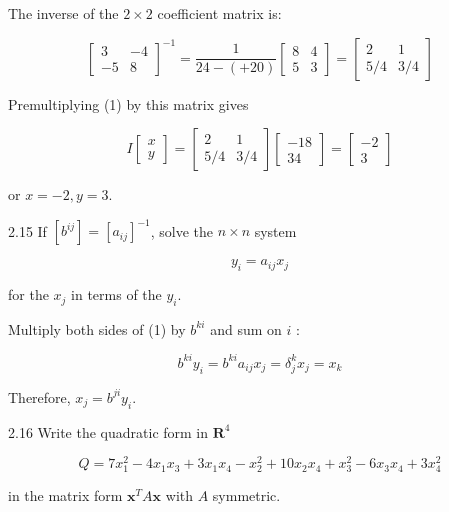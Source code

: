 \documentclass[10pt]{article}
\begin{document}
The inverse of the $2 \times 2$ coefficient matrix is:

$$
\left[\begin{array}{rr}
3 & -4 \\
-5 & 8
\end{array}\right]^{-1}=\frac{1}{24-(+20)}\left[\begin{array}{ll}
8 & 4 \\
5 & 3
\end{array}\right]=\left[\begin{array}{cc}
2 & 1 \\
5 / 4 & 3 / 4
\end{array}\right]
$$

Premultiplying (1) by this matrix gives

$$
I\left[\begin{array}{l}
x \\
y
\end{array}\right]=\left[\begin{array}{cc}
2 & 1 \\
5 / 4 & 3 / 4
\end{array}\right]\left[\begin{array}{r}
-18 \\
34
\end{array}\right]=\left[\begin{array}{r}
-2 \\
3
\end{array}\right]
$$

or $x=-2, y=3$.

2.15 If $\left[b^{i j}\right]=\left[a_{i j}\right]^{-1}$, solve the $n \times n$ system


\begin{equation*}
y_{i}=a_{i j} x_{j} \tag{1}
\end{equation*}


for the $x_{j}$ in terms of the $y_{i}$.

Multiply both sides of (1) by $b^{k i}$ and sum on $i$ :

$$
b^{k i} y_{i}=b^{k i} a_{i j} x_{j}=\delta_{j}^{k} x_{j}=x_{k}
$$

Therefore, $x_{j}=b^{j i} y_{i}$.

2.16 Write the quadratic form in $\mathbf{R}^{4}$

$$
Q=7 x_{1}^{2}-4 x_{1} x_{3}+3 x_{1} x_{4}-x_{2}^{2}+10 x_{2} x_{4}+x_{3}^{2}-6 x_{3} x_{4}+3 x_{4}^{2}
$$

in the matrix form $\mathbf{x}^{T} A \mathbf{x}$ with $A$ symmetric.
\end{document}
